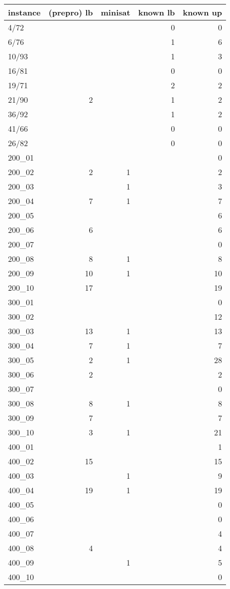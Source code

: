 \begin{tabular}{ | l || r | r || r | r | }
  \hline                        
instance &(prepro) lb	&minisat	&known lb	& known up\\
  \hline                        
4/72	&	&	&0	&0\\
6/76	&	&	&1	&6\\
10/93	&	&	&1	&3\\
16/81	&	&	&0	&0\\
19/71	&	&	&2	&2\\
21/90	&2	&	&1	&2\\
36/92	&	&	&1	&2\\
41/66	&	&	&0	&0\\
26/82	&	&	&0	&0\\
  \hline                        
200\_01	&	&	&	&0\\
200\_02	&2	&1	&	&2\\
200\_03	&	&1	&	&3\\
200\_04	&7	&1	&	&7\\
200\_05	&	&	&	&6\\
200\_06	&6	&	&	&6\\
200\_07	&	&	&	&0\\
200\_08	&8	&1	&	&8\\
200\_09	&10	&1	&	&10\\
200\_10	&17	&	&	&19\\
300\_01	&	&	&	&0\\
300\_02	&	&	&	&12\\
300\_03	&13	&1	&	&13\\
300\_04	&7	&1	&	&7\\
300\_05	&2	&1	&	&28\\
300\_06	&2	&	&	&2\\
300\_07	&	&	&	&0\\
300\_08	&8	&1	&	&8\\
300\_09	&7	&	&	&7\\
300\_10	&3	&1	&	&21\\
400\_01	&	&	&	&1\\
400\_02	&15	&	&	&15\\
400\_03	&	&1	&	&9\\
400\_04	&19	&1	&	&19\\
400\_05	&	&	&	&0\\
400\_06	&	&	&	&0\\
400\_07	&	&	&	&4\\
400\_08	&4	&	&	&4\\
400\_09	&	&1	&	&5\\
400\_10	&	&	&	&0\\
  \hline                        
\end{tabular}



